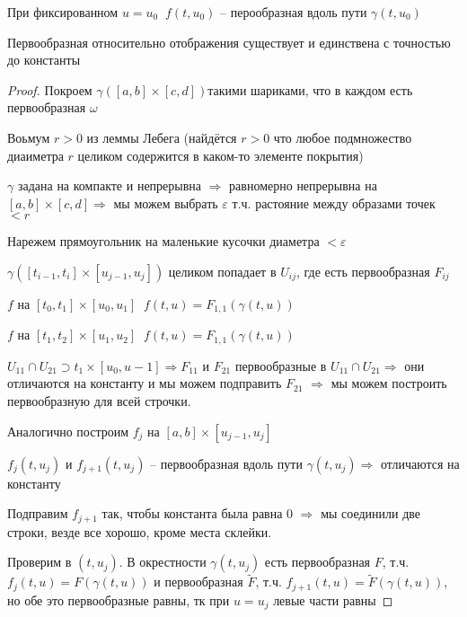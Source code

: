 \begin{remark}\thmslashn
	
	При фиксированном $u = u_0\;\; f(t, u_0)$ -- перообразная вдоль пути $\gamma(t, u_0)$ 

\end{remark}

\begin{theorem}\thmslashn

	Первообразная относительно отображения существует и единствена с точностью до константы

\end{theorem}

\begin{proof}\thmslashn
	
	Покроем $\gamma([a, b]\times[c, d])$такими шариками, что в каждом есть первообразная $\omega$
	
	Воьмум $r > 0$ из леммы Лебега (найдётся $r > 0$ что любое подмножество диаиметра $r$ целиком содержится в каком-то элементе покрытия)
	
	$\gamma$ задана на компакте и непрерывна $\Rightarrow$ равномерно непрерывна на $[a, b]\times[c, d] \Rightarrow$ мы можем выбрать $\varepsilon$ т.ч. растояние между образами точек $< r$
	
	Нарежем прямоугольник на маленькие кусочки диаметра $< \varepsilon$ 
		
	$\gamma([t_{i-1}, t_i]\times[u_{j-1}, u_j])$ целиком попадает в $U_{ij}$, где есть первообразная $F_{ij}$
	
	$f$ на $[t_{0}, t_1]\times[u_{0}, u_1] \;\; f(t, u) = F_{1, 1}(\gamma(t, u))$ 
	
	$f$ на $[t_{1}, t_2]\times[u_{1}, u_2] \;\; f(t, u) = F_{1, 1}(\gamma(t, u))$ 
	
	$U_{11} \cap U_{21} \supset {t_1} \times[u_0, u-1] \Rightarrow F_{11}$ и $F_{21}$ первообразные в $U_{11} \cap U_{21} \Rightarrow$ они отличаются на константу и мы можем подправить $F_{21}$ $\Rightarrow$ мы можем построить первообразную для всей строчки.
	
	Аналогично построим $f_j$ на $[a, b]\times[u_{j-1}, u_j]$
	
	$f_j(t, u_j)$ и $f_{j+1}(t, u_j)$ -- первообразная вдоль пути $\gamma(t, u_j) \Rightarrow$ отличаются на константу
	
	Подправим $f_{j+1}$ так, чтобы константа была равна 0 $\Rightarrow$ мы соединили две строки, везде все хорошо, кроме места склейки.
	
	Проверим в $(t, u_j)$. В окрестности $\gamma(t, u_j)$ есть первообразная $F$, т.ч. $f_j(t, u) = F(\gamma(t, u))$ и первообразная $\tilde{F}$, т.ч. $f_{j+1}(t, u) = \tilde{F}(\gamma(t, u))$, но обе это первообразные равны, тк при $u = u_j$ левые части равны
	
\end{proof}